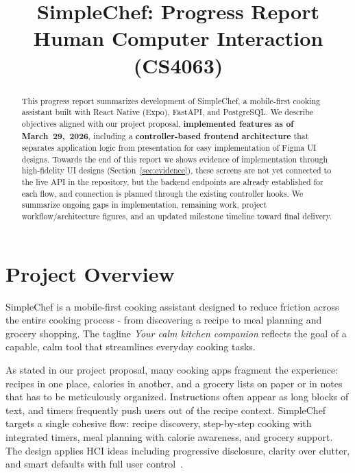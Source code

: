\documentclass[conference]{IEEEtran}
\title{SimpleChef: Progress Report\\Human Computer Interaction (CS4063)}
\author{%
\IEEEauthorblockN{Drew Skelton, Trinity Tran, Colby Frison, Carson Petty, Reese Booker }
\IEEEauthorblockA{SimpleChef - Spring 2026 \\ March 29, 2026}}
\begin{document}
\graphicspath{{figures/}}
\maketitle

\begin{abstract}
This progress report summarizes development of SimpleChef, a mobile-first cooking assistant built with React Native (Expo), FastAPI, and PostgreSQL. We describe objectives aligned with our project proposal, \textbf{implemented features as of March~29,~2026}, including a \textbf{controller-based frontend architecture} that separates application logic from presentation for easy implementation of Figma UI designs. Towards the end of this report we shows evidence of implementation through high-fidelity UI designs (Section~\ref{sec:evidence}), these screens are not yet connected to the live API in the repository, but the backend endpoints are already established for each flow, and connection is planned through the existing controller hooks. We summarize ongoing gaps in implementation, remaining work, project workflow/architecture figures, and an updated milestone timeline toward final delivery.
\end{abstract}

\section{Project Overview}
SimpleChef is a mobile-first cooking assistant designed to reduce friction across the entire cooking process - from discovering a recipe to meal planning and grocery shopping. The tagline \emph{Your calm kitchen companion} reflects the goal of a capable, calm tool that streamlines everyday cooking tasks.

As stated in our project proposal, many cooking apps fragment the experience: recipes in one place, calories in another, and a grocery lists on paper or in notes that has to be meticulously organized. Instructions often appear as long blocks of text, and timers frequently push users out of the recipe context. SimpleChef targets a single cohesive flow: recipe discovery, step-by-step cooking with integrated timers, meal planning with calorie awareness, and grocery support. The design applies HCI ideas including progressive disclosure, clarity over clutter, and smart defaults with full user control~\cite{preece2015,hartson2012ux}.
\end{document}
